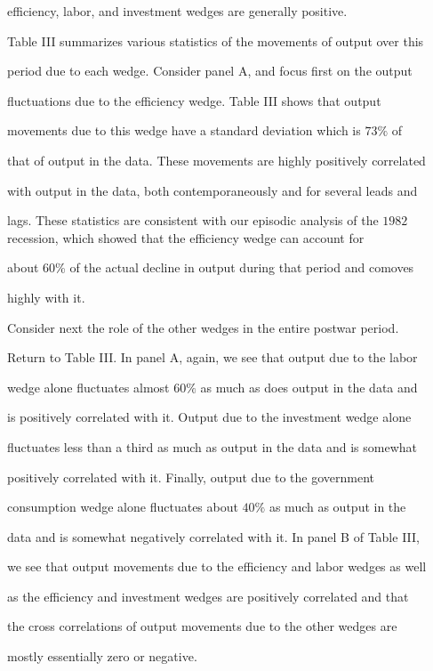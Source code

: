 \documentclass[fleqn,leqno,11pt]{article}
\begin{document}
efficiency, labor, and investment wedges are generally positive.



Table III summarizes various statistics of the movements of output over this

period due to each wedge. Consider panel A, and focus first on the output

fluctuations due to the efficiency wedge. Table III shows that output

movements due to this wedge have a standard deviation which is $73\%$ of

that of output in the data. These movements are highly positively correlated

with output in the data, both contemporaneously and for several leads and

lags. These statistics are consistent with our episodic analysis of the $%

1982 $ recession, which showed that the efficiency wedge can account for

about 60\% of the actual decline in output during that period and comoves

highly with it.



Consider next the role of the other wedges in the entire postwar period.

Return to Table III. In panel A, again, we see that output due to the labor

wedge alone fluctuates almost $60\%$ as much as does output in the data and

is positively correlated with it. Output due to the investment wedge alone

fluctuates less than a third as much as output in the data and is somewhat

positively correlated with it. Finally, output due to the government

consumption wedge alone fluctuates about $40\%$ as much as output in the

data and is somewhat negatively correlated with it. In panel B of Table III,

we see that output movements due to the efficiency and labor wedges as well

as the efficiency and investment wedges are positively correlated and that

the cross correlations of output movements due to the other wedges are

mostly essentially zero or negative.
\end{document}
